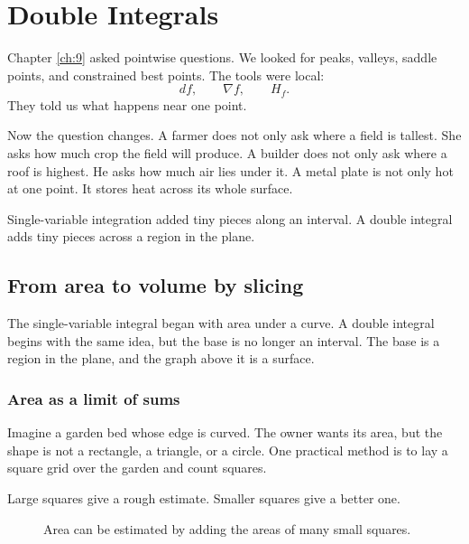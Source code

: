 
\chapter{Double Integrals}
\label{ch:10}

Chapter \ref{ch:9} asked pointwise questions.  We looked for peaks, valleys, saddle
points, and constrained best points.  The tools were local:
\[
    df,\qquad \nabla f,\qquad H_f.
\]
They told us what happens near one point.

Now the question changes.  A farmer does not only ask where a field is tallest.  She
asks how much crop the field will produce.  A builder does not only ask where a roof is
highest.  He asks how much air lies under it.  A metal plate is not only hot at one
point.  It stores heat across its whole surface.

Single-variable integration added tiny pieces along an interval.  A double integral adds
tiny pieces across a region in the plane.

\section{From area to volume by slicing}
\label{sec:10.1}

The single-variable integral began with area under a curve.  A double integral begins
with the same idea, but the base is no longer an interval.  The base is a region in the
plane, and the graph above it is a surface.

\subsection{Area as a limit of sums}

Imagine a garden bed whose edge is curved.  The owner wants its area, but the shape is
not a rectangle, a triangle, or a circle.  One practical method is to lay a square grid over
the garden and count squares.

Large squares give a rough estimate.  Smaller squares give a better one.

\begin{figure}[h]
\centering
{}
\caption{Area can be estimated by adding the areas of many small squares.}
\end{figure}

